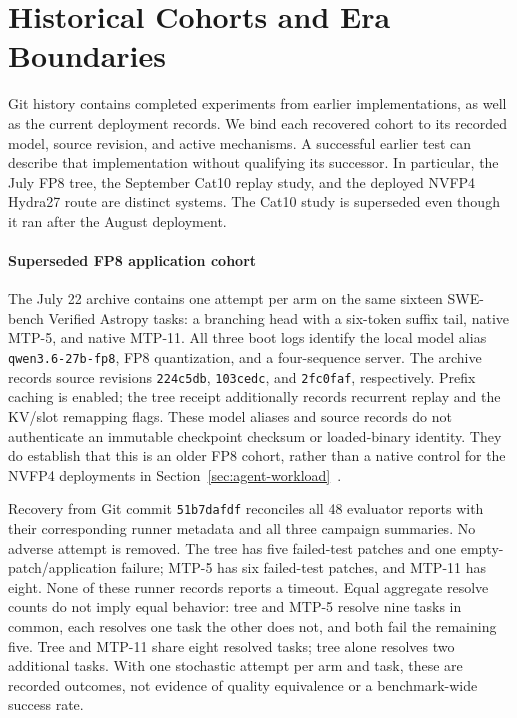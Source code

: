 \section{Historical Cohorts and Era Boundaries}
\label{app:history}
Git history contains completed experiments from earlier implementations, as well as the current deployment records. We bind each recovered cohort to its recorded model, source revision, and active mechanisms. A successful earlier test can describe that implementation without qualifying its successor. In particular, the July FP8 tree, the September Cat10 replay study, and the deployed NVFP4 Hydra27 route are distinct systems. The Cat10 study is superseded even though it ran after the August deployment.

\paragraph{Superseded FP8 application cohort}
The July 22 archive contains one attempt per arm on the same sixteen SWE-bench Verified Astropy tasks: a branching head with a six-token suffix tail, native MTP-5, and native MTP-11. All three boot logs identify the local model alias \texttt{qwen3.6-27b-fp8}, FP8 quantization, and a four-sequence server. The archive records source revisions \texttt{224c5db}, \texttt{103cedc}, and \texttt{2fc0faf}, respectively. Prefix caching is enabled; the tree receipt additionally records recurrent replay and the KV/slot remapping flags. These model aliases and source records do not authenticate an immutable checkpoint checksum or loaded-binary identity. They do establish that this is an older FP8 cohort, rather than a native control for the NVFP4 deployments in Section~\ref{sec:agent-workload}~\cite{lumo2026archive}.



Recovery from Git commit \texttt{51b7dafdf} reconciles all 48 evaluator reports with their corresponding runner metadata and all three campaign summaries. No adverse attempt is removed. The tree has five failed-test patches and one empty-patch/application failure; MTP-5 has six failed-test patches, and MTP-11 has eight. None of these runner records reports a timeout. Equal aggregate resolve counts do not imply equal behavior: tree and MTP-5 resolve nine tasks in common, each resolves one task the other does not, and both fail the remaining five. Tree and MTP-11 share eight resolved tasks; tree alone resolves two additional tasks. With one stochastic attempt per arm and task, these are recorded outcomes, not evidence of quality equivalence or a benchmark-wide success rate.

